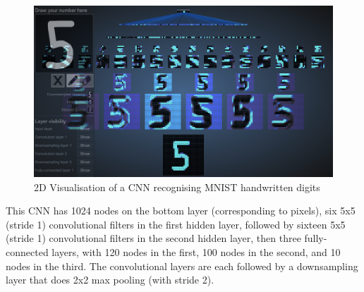 \begin{figure}[h!]
\centering
\includegraphics[width=13cm]{figures/ConvNet_2D.png}
\caption{2D Visualisation of a CNN recognising MNIST handwritten digits \cite{harley2015isvc}}
\label{fig:cnn14}
\end{figure}

This CNN has 1024 nodes on the bottom layer (corresponding to pixels), six 5x5 (stride 1) convolutional filters in the first hidden layer, followed by sixteen 5x5 (stride 1) convolutional filters in the second hidden layer, then three fully-connected layers, with 120 nodes in the first, 100 nodes in the second, and 10 nodes in the third. The convolutional layers are each followed by a downsampling layer that does 2x2 max pooling (with stride 2)\cite{harley2015isvc}.

